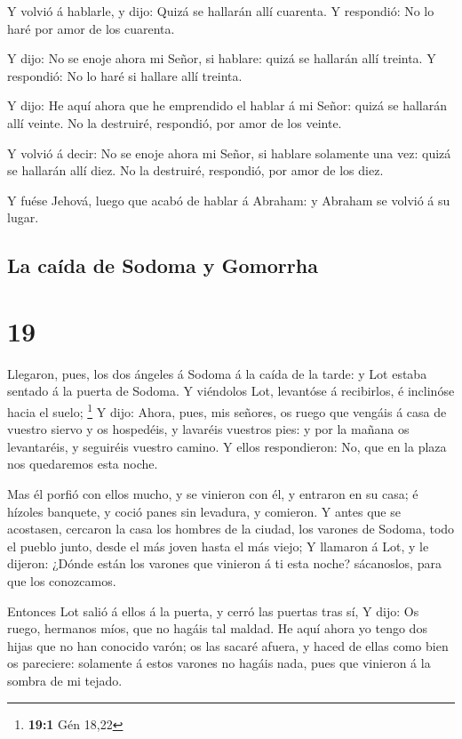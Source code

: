  Y volvió á hablarle, y dijo: Quizá se hallarán allí
cuarenta. Y respondió: No lo haré por amor de los cuarenta.

 Y dijo: No se enoje ahora mi Señor, si hablare: quizá se
hallarán allí treinta. Y respondió: No lo haré si hallare allí treinta.

 Y dijo: He aquí ahora que he emprendido el hablar á mi
Señor: quizá se hallarán allí veinte. No la destruiré, respondió, por
amor de los veinte.

 Y volvió á decir: No se enoje ahora mi Señor, si hablare
solamente una vez: quizá se hallarán allí diez. No la destruiré,
respondió, por amor de los diez.

 Y fuése Jehová, luego que acabó de hablar á Abraham: y
Abraham se volvió á su lugar.

\hypertarget{la-cauxedda-de-sodoma-y-gomorrha}{%
\subsection{La caída de Sodoma y
Gomorrha}\label{la-cauxedda-de-sodoma-y-gomorrha}}

\hypertarget{section-18}{%
\section{19}\label{section-18}}

 Llegaron, pues, los dos ángeles á Sodoma á la caída de la
tarde: y Lot estaba sentado á la puerta de Sodoma. Y viéndolos Lot,
levantóse á recibirlos, é inclinóse hacia el suelo; \footnote{\textbf{19:1}
  Gén 18,22}  Y dijo: Ahora, pues, mis señores, os ruego
que vengáis á casa de vuestro siervo y os hospedéis, y lavaréis vuestros
pies: y por la mañana os levantaréis, y seguiréis vuestro camino. Y
ellos respondieron: No, que en la plaza nos quedaremos esta noche.

 Mas él porfió con ellos mucho, y se vinieron con él, y
entraron en su casa; é hízoles banquete, y coció panes sin levadura, y
comieron.  Y antes que se acostasen, cercaron la casa los
hombres de la ciudad, los varones de Sodoma, todo el pueblo junto, desde
el más joven hasta el más viejo;  Y llamaron á Lot, y le
dijeron: ¿Dónde están los varones que vinieron á ti esta noche?
sácanoslos, para que los conozcamos.

 Entonces Lot salió á ellos á la puerta, y cerró las
puertas tras sí,  Y dijo: Os ruego, hermanos míos, que no
hagáis tal maldad.  He aquí ahora yo tengo dos hijas que
no han conocido varón; os las sacaré afuera, y haced de ellas como bien
os pareciere: solamente á estos varones no hagáis nada, pues que
vinieron á la sombra de mi tejado.

